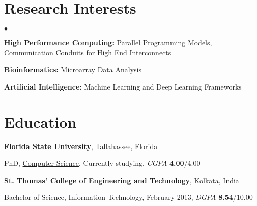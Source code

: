 \documentclass[margin,line]{res}
\newenvironment{list1}{
  \begin{list}{\ding{113}}{%
      \setlength{\itemsep}{0in}
      \setlength{\parsep}{0in} \setlength{\parskip}{0in}
      \setlength{\topsep}{0in} \setlength{\partopsep}{0in} 
      \setlength{\leftmargin}{0.17in}}}{\end{list}}
\newenvironment{list2}{
  \begin{list}{$\bullet$}{%
      \setlength{\itemsep}{0in}
      \setlength{\parsep}{0in} \setlength{\parskip}{0in}
      \setlength{\topsep}{0in} \setlength{\partopsep}{0in} 
      \setlength{\leftmargin}{0.2in}}}{\end{list}}
\begin{document}
\begin{resume}
\section{\sc Research Interests}
\begin{list2}
\item \textbf{High Performance Computing:} Parallel Programming Models, 
Communication Conduits for High End Interconnects
\item \textbf{Bioinformatics: } Microarray Data Analysis
\item \textbf{Artificial Intelligence: } Machine Learning and Deep Learning 
Frameworks
\end{list2}

\vspace*{-.15in}

\section{\sc Education}
{\bf \href{http://www.fsu.edu}{Florida State University}}, Tallahassee, Florida\\
\vspace*{-.15in}
\begin{list1}
\item[] PhD, \href{http://www.cs.fsu.edu/}{Computer Science}, Currently studying, \textit{CGPA} \textbf{4.00}/4.00
\end{list1}
\vspace*{-.15in}
{\bf \href{http://www.stcet.org/}{St. Thomas' College of Engineering and 
Technology}}, Kolkata, India\\
\vspace*{-.15in}
\begin{list1}
\item[] Bachelor of Science, Information Technology, February 2013, 
\textit{DGPA} \textbf{8.54}/10.00
\end{list1}


\end{resume}
\end{document}
